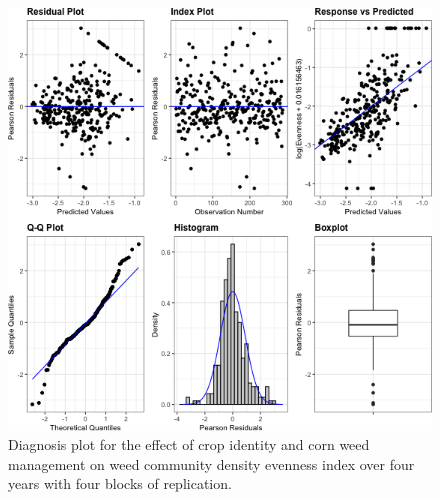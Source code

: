\documentclass[
]{article}
\begin{document}
\begin{figure}
\centering
\includegraphics{AppendixA-model-diagnosis_files/figure-latex/dens-even-mod-1.png}
\caption{\label{fig:dens-even-mod}Diagnosis plot for the effect of crop identity and corn weed management on weed community density evenness index over four years with four blocks of replication.}
\end{figure}
\end{document}
